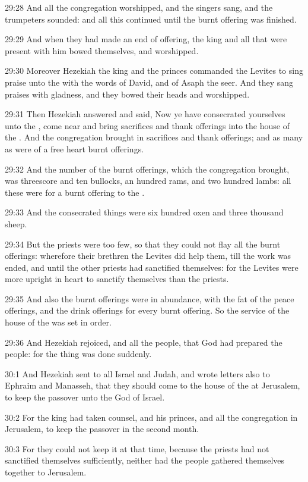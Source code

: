 29:28 And all the congregation worshipped, and the singers sang, and the trumpeters sounded: and all this continued until the burnt offering was finished.

29:29 And when they had made an end of offering, the king and all that were present with him bowed themselves, and worshipped.

29:30 Moreover Hezekiah the king and the princes commanded the Levites to sing praise unto the \LORD with the words of David, and of Asaph the seer. And they sang praises with gladness, and they bowed their heads and worshipped.

29:31 Then Hezekiah answered and said, Now ye have consecrated yourselves unto the \LORD, come near and bring sacrifices and thank offerings into the house of the \LORD. And the congregation brought in sacrifices and thank offerings; and as many as were of a free heart burnt offerings.

29:32 And the number of the burnt offerings, which the congregation brought, was threescore and ten bullocks, an hundred rams, and two hundred lambs: all these were for a burnt offering to the \LORD.

29:33 And the consecrated things were six hundred oxen and three thousand sheep.

29:34 But the priests were too few, so that they could not flay all the burnt offerings: wherefore their brethren the Levites did help them, till the work was ended, and until the other priests had sanctified themselves: for the Levites were more upright in heart to sanctify themselves than the priests.

29:35 And also the burnt offerings were in abundance, with the fat of the peace offerings, and the drink offerings for every burnt offering.  So the service of the house of the \LORD was set in order.

29:36 And Hezekiah rejoiced, and all the people, that God had prepared the people: for the thing was done suddenly.

30:1 And Hezekiah sent to all Israel and Judah, and wrote letters also to Ephraim and Manasseh, that they should come to the house of the \LORD at Jerusalem, to keep the passover unto the \LORD God of Israel.

30:2 For the king had taken counsel, and his princes, and all the congregation in Jerusalem, to keep the passover in the second month.

30:3 For they could not keep it at that time, because the priests had not sanctified themselves sufficiently, neither had the people gathered themselves together to Jerusalem.

